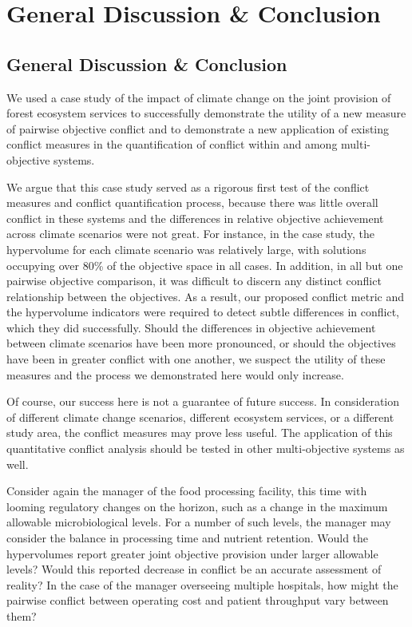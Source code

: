 \chapter{General Discussion \& Conclusion}
\section{General Discussion \& Conclusion}
We used a case study of the impact of climate change on the joint provision of forest ecosystem services to successfully demonstrate the utility of a new measure of pairwise objective conflict and to demonstrate a new application of existing conflict measures in the quantification of conflict within and among multi-objective systems.

We argue that this case study served as a rigorous first test of the conflict measures and conflict quantification process, because there was little overall conflict in these systems and the differences in relative objective achievement across climate scenarios were not great. For instance, in the case study, the hypervolume for each climate scenario was relatively large, with solutions occupying over 80\% of the objective space in all cases. In addition, in all but one pairwise objective comparison, it was difficult to discern any distinct conflict relationship between the objectives. As a result, our proposed conflict metric and the hypervolume indicators were required to detect subtle differences in conflict, which they did successfully. Should the differences in objective achievement between climate scenarios have been more pronounced, or should the objectives have been in greater conflict with one another, we suspect the utility of these measures and the process we demonstrated here would only increase.

Of course, our success here is not a guarantee of future success. In consideration of different climate change scenarios, different ecosystem services, or a different study area, the conflict measures may prove less useful. The application of this quantitative conflict analysis should be tested in other multi-objective systems as well.

Consider again the manager of the food processing facility, this time with looming regulatory changes on the horizon, such as a change in the maximum allowable microbiological levels. For a number of such levels, the manager may consider the balance in processing time and nutrient retention. Would the hypervolumes report greater joint objective provision under larger allowable levels? Would this reported decrease in conflict be an accurate assessment of reality? In the case of the manager overseeing multiple hospitals, how might the pairwise conflict between operating cost and patient throughput vary between them?

